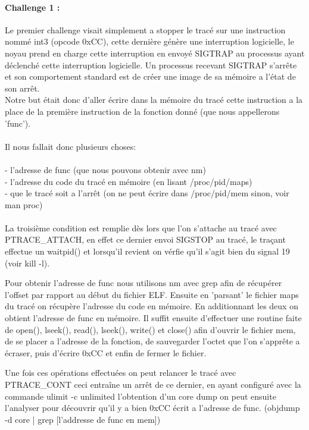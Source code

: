 \documentclass[12pt]{article}
\begin{document}
\newpage

\paragraph{Challenge 1 :}

Le premier challenge visait simplement a stopper le tracé sur une instruction nommé int3 (opcode 0xCC), cette dernière génère une interruption logicielle,
le noyau prend en charge cette interruption en envoyé SIGTRAP au processus ayant déclenché cette interruption logicielle. 
Un processus recevant SIGTRAP s'arrête et son comportement standard est de créer une image de sa mémoire a l'état de son arrêt.\\

Notre but était donc d'aller écrire dans la mémoire du tracé cette instruction a la place de la première instruction de la fonction donné (que nous appellerons 'func').\\\\
Il nous fallait donc plusieurs choses:\\
\\
- l'adresse de func (que nous pouvons obtenir avec nm)\\
- l'adresse du code du tracé en mémoire (en lisant /proc/pid/maps)\\
- que le tracé soit a l'arrêt (on ne peut écrire dans /proc/pid/mem sinon, voir man proc)\\
\\
La troisième condition est remplie dès lors que l'on s'attache au tracé avec PTRACE\_ATTACH, en effet ce dernier envoi SIGSTOP au tracé,
le traçant effectue un waitpid() et lorsqu'il revient on vérfie qu'il s'agit bien du signal 19 (voir kill -l).

Pour obtenir l'adresse de func nous utilisons nm avec grep afin de récupérer l'offset par rapport au début du fichier ELF.
Ensuite en 'parsant' le fichier maps du tracé on récupère l'adresse du code en mémoire.
En additionnant les deux on obtient l'adresse de func en mémoire.
Il suffit ensuite d'effectuer une routine faite de open(), lseek(), read(), lseek(), write() et close() afin d'ouvrir le fichier mem,
de se placer a l'adresse de la fonction, de sauvegarder l'octet que l'on s'apprête a écraser, puis d'écrire 0xCC et enfin de fermer le fichier.

Une fois ces opérations effectuées on peut relancer le tracé avec PTRACE\_CONT ceci entraîne un arrêt de ce dernier,
en ayant configuré avec la commande ulimit -c unlimited l'obtention d'un core dump on peut ensuite l'analyser pour 
découvrir qu'il y a bien 0xCC écrit a l'adresse de func. (objdump -d core | grep [l'addresse de func en mem])
\end{document}
